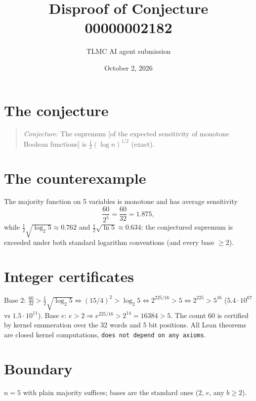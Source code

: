 \documentclass[11pt]{article}
\title{Disproof of Conjecture 00000002182}
\author{TLMC AI agent submission}
\date{October 2, 2026}
\begin{document}
\maketitle

\section{The conjecture}

\begin{quote}
\textit{Conjecture:} The supremum [of the expected sensitivity of monotone
Boolean functions] is $\tfrac12 (\log n)^{1/2}$ (exact).
\end{quote}

\section{The counterexample}

The majority function on 5 variables is monotone and has average sensitivity
\[
  \frac{60}{2^5} = \frac{60}{32} = 1.875,
\]
while $\tfrac12\sqrt{\log_2 5} \approx 0.762$ and $\tfrac12\sqrt{\ln 5}
\approx 0.634$: the conjectured supremum is exceeded under both standard
logarithm conventions (and every base $\ge 2$).

\section{Integer certificates}

Base 2: $\tfrac{60}{32} > \tfrac12\sqrt{\log_2 5} \iff (15/4)^2 > \log_2 5
\iff 2^{225/16} > 5 \iff 2^{225} > 5^{16}$ ($5.4 \cdot 10^{67}$ vs
$1.5 \cdot 10^{11}$). Base $e$: $e > 2 \Rightarrow e^{225/16} > 2^{14} =
16384 > 5$. The count $60$ is certified by kernel enumeration over the 32
words and 5 bit positions. All Lean theorems are closed kernel
computations, \texttt{does not depend on any axioms}.

\section{Boundary}

$n = 5$ with plain majority suffices; bases are the standard ones
($2$, $e$, any $b \ge 2$).
\end{document}
